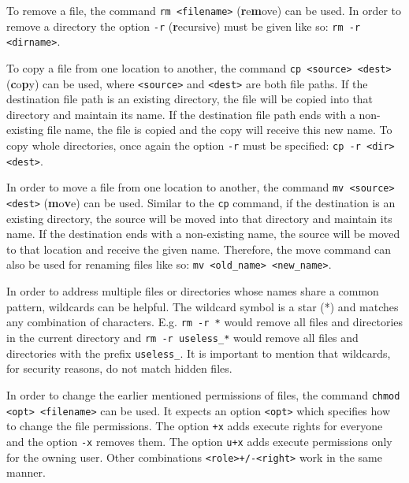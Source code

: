 To remove a file, the command \lstinline{rm <filename>} (\textbf{r}e\textbf{m}ove) can be used. In order to remove a directory the option \lstinline{-r} (\textbf{r}ecursive) must be given like so: \lstinline{rm -r <dirname>}.

To copy a file from one location to another, the command \lstinline{cp <source> <dest>} (\textbf{c}o\textbf{p}y) can be used, where \lstinline{<source>} and \lstinline{<dest>} are both file paths. If the destination file path is an existing directory, the file will be copied into that directory and maintain its name. If the destination file path ends with a non-existing file name, the file is copied and the copy will receive this new name. To copy whole directories, once again the option \lstinline{-r} must be specified: \lstinline{cp -r <dir> <dest>}.

In order to move a file from one location to another, the command \lstinline{mv <source> <dest>} (\textbf{m}o\textbf{v}e) can be used. Similar to the \lstinline{cp} command, if the destination is an existing directory, the source will be moved into that directory and maintain its name. If the destination ends with a non-existing name, the source will be moved to that location and receive the given name. Therefore, the move command can also be used for renaming files like so: \lstinline{mv <old_name> <new_name>}.

In order to address multiple files or directories whose names share a common pattern, wildcards can be helpful. The wildcard symbol is a star (*) and matches any combination of characters. E.g. \lstinline{rm -r *} would remove all files and directories in the current directory and \lstinline{rm -r useless_*} would remove all files and directories with the prefix \lstinline{useless_}. It is important to mention that wildcards, for security reasons, do not match hidden files.

In order to change the earlier mentioned permissions of files, the command \lstinline{chmod <opt> <filename>} can be used. It expects an option \lstinline{<opt>} which specifies how to change the file permissions. The option \lstinline{+x} adds execute rights for everyone and the option \lstinline{-x} removes them. The option \lstinline{u+x} adds execute permissions only for the owning user. Other combinations \lstinline{<role>+/-<right>} work in the same manner.

